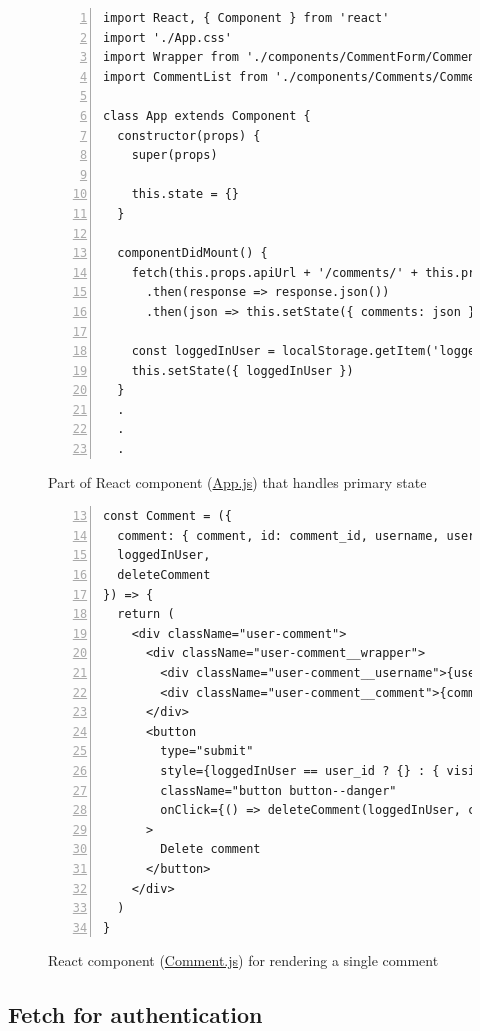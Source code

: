 \documentclass[a4paper]{scrartcl}
\begin{document}
\begin{figure}
	\begin{lstlisting}[frame=single, numbers=left, breaklines=true, basicstyle=\ttfamily\footnotesize, firstnumber=1]
import React, { Component } from 'react'
import './App.css'
import Wrapper from './components/CommentForm/CommentFormWrapper'
import CommentList from './components/Comments/Comment'

class App extends Component {
  constructor(props) {
    super(props)

    this.state = {}
  }

  componentDidMount() {
    fetch(this.props.apiUrl + '/comments/' + this.props.recipeId)
      .then(response => response.json())
      .then(json => this.setState({ comments: json }))

    const loggedInUser = localStorage.getItem('loggedInUser')
    this.setState({ loggedInUser })
  }
  .
  .
  .
	\end{lstlisting}
	\caption{Part of React component  (\href{https://github.com/juliuscc/kth-id1354/blob/master/homework-4/front-end/tasty_temp/src/App.js}{App.js}) that handles primary state}
	\label{fig:react-container}
\end{figure}

\begin{figure}
\begin{lstlisting}[frame=single, numbers=left, breaklines=true, basicstyle=\ttfamily\footnotesize, firstnumber=13]
const Comment = ({
  comment: { comment, id: comment_id, username, user_id },
  loggedInUser,
  deleteComment
}) => {
  return (
    <div className="user-comment">
      <div className="user-comment__wrapper">
        <div className="user-comment__username">{username}</div>
        <div className="user-comment__comment">{comment}</div>
      </div>
      <button
        type="submit"
        style={loggedInUser == user_id ? {} : { visibility: 'hidden' }}
        className="button button--danger"
        onClick={() => deleteComment(loggedInUser, comment_id)}
      >
        Delete comment
      </button>
    </div>
  )
}
\end{lstlisting}
	\caption{React component (\href{https://github.com/juliuscc/kth-id1354/blob/f811132bd5cd1c4ac30e0b60e7a2f64143a6d152/homework-4/front-end/tasty-app/components/Comments/Comment.js\#L13}{Comment.js}) for rendering a single comment}
	\label{fig:react-component}
\end{figure}

\subsection{Fetch for authentication}
\end{document}
